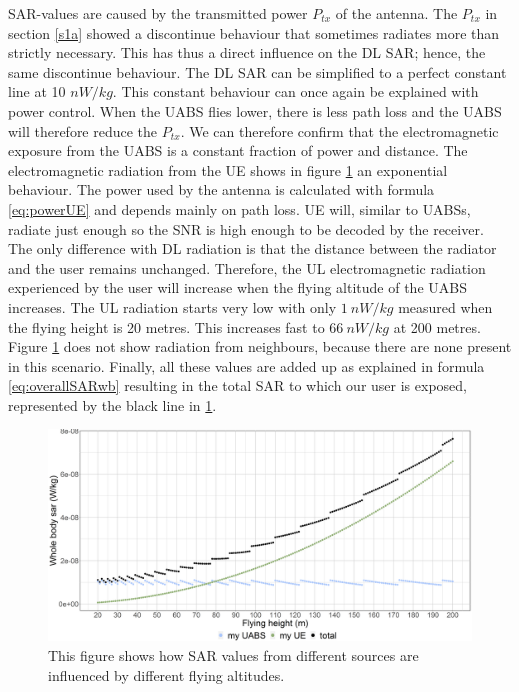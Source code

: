 \gls{SAR}-values are caused by the transmitted power  $P_{tx}$ of the antenna. The $P_{tx}$ in section \ref{s1a}
showed a discontinue behaviour that sometimes radiates more than strictly necessary. This has thus a direct influence
on the \gls{DL} \gls{SAR}; hence, the same discontinue behaviour. The \gls{DL} \gls{SAR} can be simplified to a perfect constant line
at 10 $nW/kg$.
This constant behaviour can once again be explained with power control. When the \gls{UABS} flies lower, there is less path loss and the \gls{UABS} 
will therefore reduce the $P_{tx}$. 
We can therefore confirm that the electromagnetic exposure from the \gls{UABS} is a constant fraction of power and distance.
The electromagnetic radiation from the \gls{UE} shows in figure \ref{fig:s1_fhsar} an exponential behaviour. The power
used by the antenna is calculated with formula \ref{eq:powerUE}  and depends mainly on path loss.
\gls{UE} will, similar to \gls{UABS}s, radiate just enough so the \gls{SNR} is high enough to be decoded by the receiver.
The only difference with \gls{DL} radiation is that the distance between the radiator and the user remains unchanged. 
Therefore, the \gls{UL} electromagnetic radiation experienced by the user will increase when the flying altitude of the \gls{UABS} increases.
The \gls{UL} radiation starts very low with only $1\ nW/kg$ measured when the flying height is 20 metres. This increases fast to $66\ nW/kg$
at 200 metres.
Figure \ref{fig:s1_fhsar} does not show radiation from neighbours, because there are none present in this scenario. 
Finally, all these values are added up as explained in formula \ref{eq:overallSARwb} resulting in the total \gls{SAR}
to which our user is exposed, represented by the black line in \ref{fig:s1_fhsar}.

\begin{figure}[]
\centering
  \includegraphics[width=\textwidth]{../results/s1/fhvssar.png}
  \caption{This figure shows how SAR values from different sources are influenced by different flying altitudes.}
  \label{fig:s1_fhsar}
\end{figure}

